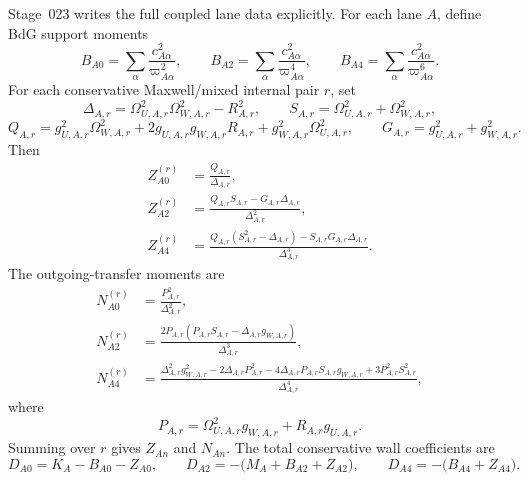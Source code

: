 Stage~023 writes the full coupled lane data explicitly.  For each lane \(A\), define BdG support moments
\begin{equation}
\label{eq:part01-B-moments}
B_{A0}=\sum_\alpha\frac{c_{A\alpha}^2}{\varpi_{A\alpha}^2},
\qquad
B_{A2}=\sum_\alpha\frac{c_{A\alpha}^2}{\varpi_{A\alpha}^4},
\qquad
B_{A4}=\sum_\alpha\frac{c_{A\alpha}^2}{\varpi_{A\alpha}^6}.
\end{equation}
For each conservative Maxwell/mixed internal pair \(r\), set
\begin{equation}
\Delta_{A,r}=\Omega_{U,A,r}^2\Omega_{W,A,r}^2-R_{A,r}^2,
\qquad
S_{A,r}=\Omega_{U,A,r}^2+\Omega_{W,A,r}^2,
\end{equation}
\begin{equation}
Q_{A,r}
=
g_{U,A,r}^2\Omega_{W,A,r}^2
+
2g_{U,A,r}g_{W,A,r}R_{A,r}
+
g_{W,A,r}^2\Omega_{U,A,r}^2,
\qquad
G_{A,r}=g_{U,A,r}^2+g_{W,A,r}^2.
\end{equation}
Then
\begin{equation}
\label{eq:part01-Z-moments}
\boxed{
\begin{aligned}
Z_{A0}^{(r)}&=\frac{Q_{A,r}}{\Delta_{A,r}},\\
Z_{A2}^{(r)}&=\frac{Q_{A,r}S_{A,r}-G_{A,r}\Delta_{A,r}}{\Delta_{A,r}^2},\\
Z_{A4}^{(r)}&=
\frac{Q_{A,r}(S_{A,r}^2-\Delta_{A,r})-S_{A,r}G_{A,r}\Delta_{A,r}}
{\Delta_{A,r}^3}.
\end{aligned}
}
\end{equation}
The outgoing-transfer moments are
\begin{equation}
\label{eq:part01-N-moments}
\boxed{
\begin{aligned}
N_{A0}^{(r)}&=\frac{P_{A,r}^2}{\Delta_{A,r}^2},\\
N_{A2}^{(r)}&=
\frac{2P_{A,r}(P_{A,r}S_{A,r}-\Delta_{A,r}g_{W,A,r})}
{\Delta_{A,r}^3},\\
N_{A4}^{(r)}&=
\frac{\Delta_{A,r}^2g_{W,A,r}^2-2\Delta_{A,r}P_{A,r}^2-4\Delta_{A,r}P_{A,r}S_{A,r}g_{W,A,r}+3P_{A,r}^2S_{A,r}^2}
{\Delta_{A,r}^4},
\end{aligned}
}
\end{equation}
where
\begin{equation}
P_{A,r}=\Omega_{U,A,r}^2g_{W,A,r}+R_{A,r}g_{U,A,r}.
\end{equation}
Summing over \(r\) gives \(Z_{An}\) and \(N_{An}\).  The total conservative wall coefficients are
\begin{equation}
\label{eq:part01-full-D-coefficients}
\boxed{
D_{A0}=K_A-B_{A0}-Z_{A0},
\qquad
D_{A2}=-\bigl(M_A+B_{A2}+Z_{A2}\bigr),
\qquad
D_{A4}=-\bigl(B_{A4}+Z_{A4}\bigr)}.
\end{equation}

